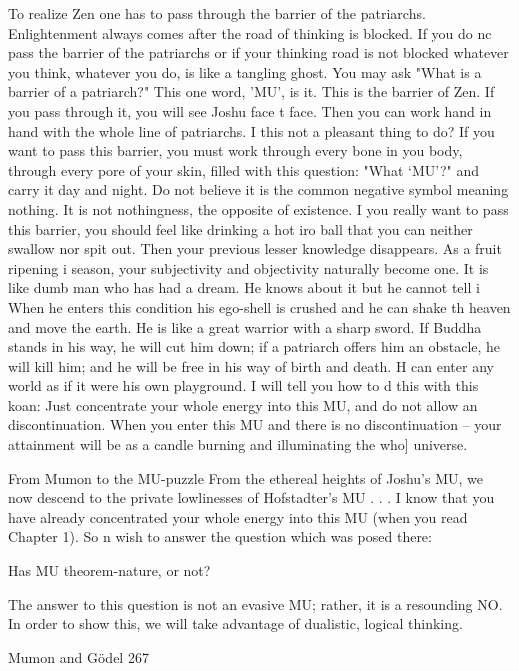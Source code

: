   To realize Zen one has to pass through the barrier of the patriarchs. Enlightenment
  always comes after the road of thinking is blocked. If you do nc pass the barrier of the
  patriarchs or if your thinking road is not blocked whatever you think, whatever you
  do, is like a tangling ghost. You may ask "What is a barrier of a patriarch?" This one
  word, 'MU', is it.
       This is the barrier of Zen. If you pass through it, you will see Joshu face t face.
  Then you can work hand in hand with the whole line of patriarchs. I this not a pleasant
  thing to do?
       If you want to pass this barrier, you must work through every bone in you body,
  through every pore of your skin, filled with this question: "What `MU'?" and carry it
  day and night. Do not believe it is the common negative symbol meaning nothing. It is
  not nothingness, the opposite of existence. I you really want to pass this barrier, you
  should feel like drinking a hot iro ball that you can neither swallow nor spit out.
       Then your previous lesser knowledge disappears. As a fruit ripening i season,
  your subjectivity and objectivity naturally become one. It is like dumb man who has
  had a dream. He knows about it but he cannot tell i
       When he enters this condition his ego-shell is crushed and he can shake th heaven
  and move the earth. He is like a great warrior with a sharp sword. If Buddha stands in
  his way, he will cut him down; if a patriarch offers him an obstacle, he will kill him;
  and he will be free in his way of birth and death. H can enter any world as if it were
  his own playground. I will tell you how to d this with this koan:
       Just concentrate your whole energy into this MU, and do not allow an
  discontinuation. When you enter this MU and there is no discontinuation -- your
  attainment will be as a candle burning and illuminating the who] universe.

                        From Mumon to the MU-puzzle
From the ethereal heights of Joshu's MU, we now descend to the private lowlinesses of
Hofstadter's MU . . . I know that you have already concentrated your whole energy into
this MU (when you read Chapter 1). So n wish to answer the question which was posed
there:

                            Has MU theorem-nature, or not?

The answer to this question is not an evasive MU; rather, it is a resounding NO. In order
to show this, we will take advantage of dualistic, logical thinking.


Mumon and Gödel                                                                       267

